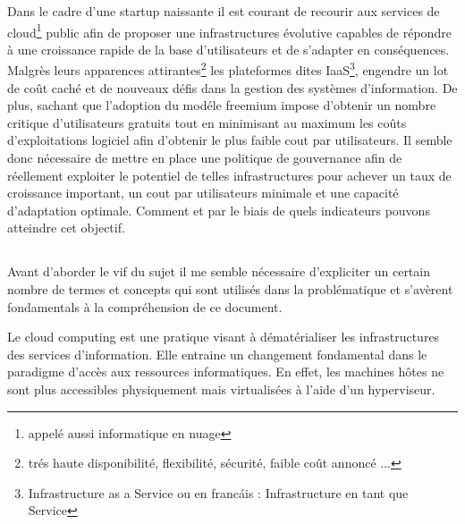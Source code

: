 \documentclass[11pt, a4paper ]{article}
\begin{document}
\begin{spacing}{1.5}
Dans le cadre d'une startup naissante il est courant de recourir aux services de cloud\footnote{appelé aussi informatique en nuage} public afin de proposer une infrastructures évolutive capables de répondre à une croissance rapide de la base d'utilisateurs et de s'adapter en conséquences.
Malgrès leurs apparences attirantes\footnote{trés haute disponibilité, flexibilité, sécurité, faible coût annoncé ...} les plateformes dites IaaS\footnote{Infrastructure as a Service ou en francáis : Infrastructure en tant que Service}, engendre un lot de coût caché et de nouveaux défis dans la gestion des systèmes d'information.
De plus, sachant que l'adoption du modéle freemium impose d'obtenir un nombre critique d'utilisateurs gratuits tout en minimisant au maximum les coûts d'exploitations logiciel afin d'obtenir le plus faible cout par utilisateurs.
Il semble donc nécessaire de mettre en place une politique de gouvernance afin de réellement exploiter le potentiel de telles infrastructures pour achever un taux de croissance important, un cout par utilisateurs minimale et une capacité d'adaptation optimale. Comment et par le biais de quels indicateurs pouvons atteindre cet objectif.


			\subsection*{}

Avant d'aborder le vif du sujet il me semble nécessaire d'expliciter un certain nombre de termes et concepts qui sont utilisés dans la problématique et s'avèrent fondamentals à la compréhension de ce document.

Le cloud computing\cite{cloudDef} est une pratique visant à dématérialiser les infrastructures des services d'information. Elle entraine un changement fondamental dans le paradigme d'accès aux ressources informatiques. En effet, les machines hôtes ne sont plus accessibles physiquement mais virtualisées à l'aide d'un hyperviseur.


\end{spacing}
\end{document}

